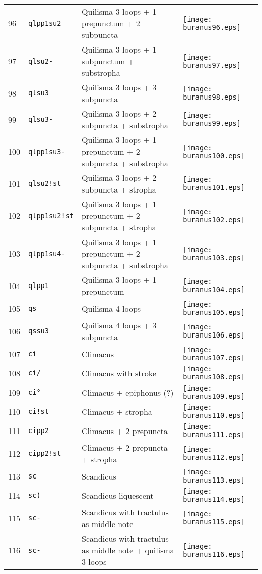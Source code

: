 \documentclass{scrarticle}
\begin{document}
\begin{longtable}{l|l|l|l}
96 & \texttt{qlpp1su2} & Quilisma 3 loops + 1 prepunctum + 2 subpuncta & \texttt{[image: buranus96.eps]} \\
97 & \texttt{qlsu2-} & Quilisma 3 loops + 1 subpunctum + substropha & \texttt{[image: buranus97.eps]} \\
98 & \texttt{qlsu3} & Quilisma 3 loops + 3 subpuncta & \texttt{[image: buranus98.eps]} \\
99 & \texttt{qlsu3-} & Quilisma 3 loops + 2 subpuncta + substropha & \texttt{[image: buranus99.eps]} \\
100 & \texttt{qlpp1su3-} & Quilisma 3 loops + 1 prepunctum + 2 subpuncta + substropha & \texttt{[image: buranus100.eps]} \\
101 & \texttt{qlsu2!st} & Quilisma 3 loops + 2 subpuncta + stropha & \texttt{[image: buranus101.eps]} \\
102 & \texttt{qlpp1su2!st} & Quilisma 3 loops + 1 prepunctum + 2 subpuncta + stropha & \texttt{[image: buranus102.eps]} \\
103 & \texttt{qlpp1su4-} & Quilisma 3 loops + 1 prepunctum + 2 subpuncta + substropha & \texttt{[image: buranus103.eps]} \\
104 & \texttt{qlpp1} & Quilisma 3 loops + 1 prepunctum & \texttt{[image: buranus104.eps]} \\
105 & \texttt{qs} & Quilisma 4 loops & \texttt{[image: buranus105.eps]} \\
106 & \texttt{qssu3} & Quilisma 4 loops + 3 subpuncta & \texttt{[image: buranus106.eps]} \\
107 & \texttt{ci} & Climacus & \texttt{[image: buranus107.eps]} \\
108 & \texttt{ci/} & Climacus with stroke & \texttt{[image: buranus108.eps]} \\
109 & \texttt{ci°} & Climacus + epiphonus (?) & \texttt{[image: buranus109.eps]} \\
110 & \texttt{ci!st} & Climacus + stropha & \texttt{[image: buranus110.eps]} \\
111 & \texttt{cipp2} & Climacus + 2 prepuncta & \texttt{[image: buranus111.eps]} \\
112 & \texttt{cipp2!st} & Climacus + 2 prepuncta + stropha & \texttt{[image: buranus112.eps]} \\
113 & \texttt{sc} & Scandicus & \texttt{[image: buranus113.eps]} \\
114 & \texttt{sc)} & Scandicus liquescent & \texttt{[image: buranus114.eps]} \\
115 & \texttt{sc-} & Scandicus with tractulus as middle note & \texttt{[image: buranus115.eps]} \\
116 & \texttt{sc-} & Scandicus with tractulus as middle note + quilisma 3 loops & \texttt{[image: buranus116.eps]} \\\end{longtable}
\end{document}
